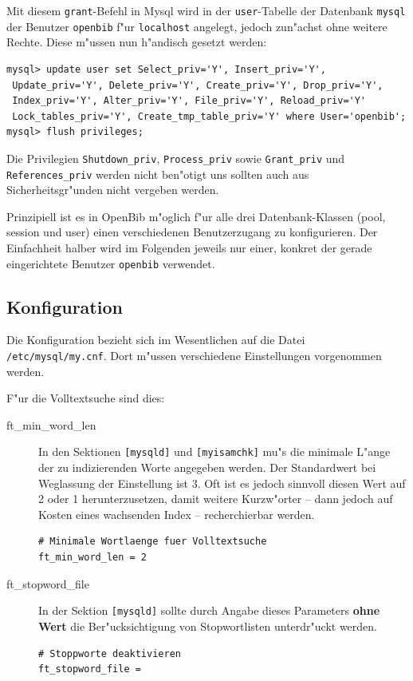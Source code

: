 \documentclass[11pt, twoside, a4paper, BCOR8mm, DIV12, bibtotoc,idxtotoc]{scrbook}
\begin{document}
Mit diesem \texttt{grant}-Befehl in Mysql wird in der
\texttt{user}-Tabelle der Datenbank \texttt{mysql} der Benutzer
\texttt{openbib} f"ur \texttt{localhost} angelegt, jedoch zun"achst
ohne weitere Rechte. Diese m"ussen nun h"andisch gesetzt werden:

\begin{verbatim}
mysql> update user set Select_priv='Y', Insert_priv='Y',
 Update_priv='Y', Delete_priv='Y', Create_priv='Y', Drop_priv='Y', 
 Index_priv='Y', Alter_priv='Y', File_priv='Y', Reload_priv='Y' 
 Lock_tables_priv='Y', Create_tmp_table_priv='Y' where User='openbib';
mysql> flush privileges;
\end{verbatim}

Die Privilegien \texttt{Shutdown\_priv},
\texttt{Process\_priv} sowie \texttt{Grant\_priv}
und \texttt{References\_priv} werden nicht ben"otigt uns sollten auch
aus Sicherheitsgr"unden nicht vergeben werden.

Prinzipiell ist es in OpenBib m"oglich f"ur alle drei
Datenbank-Klassen (pool, session und user) einen verschiedenen
Benutzerzugang zu konfigurieren. Der Einfachheit halber wird im
Folgenden jeweils nur einer, konkret der gerade eingerichtete Benutzer
\texttt{openbib} verwendet.


\subsection{Konfiguration}

Die Konfiguration bezieht sich im Wesentlichen auf die Datei
\texttt{/etc/mysql/my.cnf}. Dort m"ussen verschiedene Einstellungen
vorgenommen werden.

F"ur die Volltextsuche sind dies:

\begin{description}
\item[ft\_min\_word\_len] In den Sektionen \texttt{[mysqld]} und
  \texttt{[myisamchk]} mu"s die minimale L"ange der zu indizierenden
  Worte angegeben werden. Der Standardwert bei Weglassung der
  Einstellung ist 3. Oft ist es jedoch sinnvoll diesen Wert auf 2 oder
  1 herunterzusetzen, damit weitere Kurzw"orter -- dann jedoch auf
  Kosten eines wachsenden Index -- recherchierbar werden.
\begin{verbatim}
# Minimale Wortlaenge fuer Volltextsuche
ft_min_word_len = 2
\end{verbatim}
\item[ft\_stopword\_file] In der Sektion \texttt{[mysqld]} sollte
  durch Angabe dieses Parameters \textbf{ohne Wert} die
  Ber"ucksichtigung von Stopwortlisten unterdr"uckt werden.
\begin{verbatim}
# Stoppworte deaktivieren
ft_stopword_file =
\end{verbatim}
\end{description}
\end{document}
